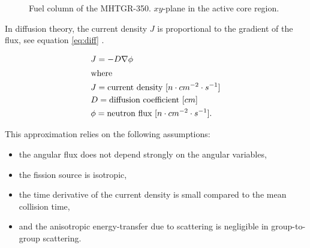 \begin{figure}[htbp!]
	\centering
	\hfill
    \caption{Fuel column of the MHTGR-350. $xy$-plane in the active core region.}
	\label{fig:fuelcolumn}
\end{figure}

In diffusion theory, the current density $J$ is proportional to the gradient of the flux, see equation \ref{eq:diff} \cite{leppanen_development_2007}.

\begin{align}
   & J = - D \nabla \phi \label{eq:diff} \\
   \intertext{where}
   & J = \mbox{current density } [n \cdot cm^{-2} \cdot s^{-1}] \notag \\
   & D = \mbox{diffusion coefficient } [cm] \notag \\
   & \phi = \mbox{neutron flux } [n \cdot cm^{-2} \cdot s^{-1}]. \notag
\end{align}

This approximation relies on the following assumptions:
\begin{itemize}
	\item the angular flux does not depend strongly on the angular variables,
	\item the fission source is isotropic,
	\item the time derivative of the current density is small compared to the mean collision time,
	\item and the anisotropic energy-transfer due to scattering is negligible in group-to-group scattering.
\end{itemize}

